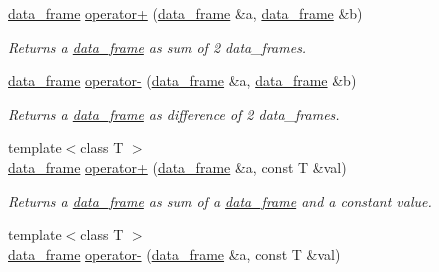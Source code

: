 \begin{DoxyCompactItemize}
\item 
\hyperlink{classboost_1_1numeric_1_1ublas_1_1data__frame}{data\+\_\+frame} \hyperlink{classboost_1_1numeric_1_1ublas_1_1data__frame_a9f8e1971f815794218a6263e5dfd75de}{operator+} (\hyperlink{classboost_1_1numeric_1_1ublas_1_1data__frame}{data\+\_\+frame} \&a, \hyperlink{classboost_1_1numeric_1_1ublas_1_1data__frame}{data\+\_\+frame} \&b)
\begin{DoxyCompactList}\small\item\em Returns a \hyperlink{classboost_1_1numeric_1_1ublas_1_1data__frame}{data\+\_\+frame} as sum of 2 data\+\_\+frames. \end{DoxyCompactList}\item 
\hyperlink{classboost_1_1numeric_1_1ublas_1_1data__frame}{data\+\_\+frame} \hyperlink{classboost_1_1numeric_1_1ublas_1_1data__frame_a5335edb8f4c4e47904709353bbc0be62}{operator-\/} (\hyperlink{classboost_1_1numeric_1_1ublas_1_1data__frame}{data\+\_\+frame} \&a, \hyperlink{classboost_1_1numeric_1_1ublas_1_1data__frame}{data\+\_\+frame} \&b)
\begin{DoxyCompactList}\small\item\em Returns a \hyperlink{classboost_1_1numeric_1_1ublas_1_1data__frame}{data\+\_\+frame} as difference of 2 data\+\_\+frames. \end{DoxyCompactList}\item 
{\footnotesize template$<$class T $>$ }\\\hyperlink{classboost_1_1numeric_1_1ublas_1_1data__frame}{data\+\_\+frame} \hyperlink{classboost_1_1numeric_1_1ublas_1_1data__frame_ad9563098b841adefde7f5075143a7992}{operator+} (\hyperlink{classboost_1_1numeric_1_1ublas_1_1data__frame}{data\+\_\+frame} \&a, const T \&val)
\begin{DoxyCompactList}\small\item\em Returns a \hyperlink{classboost_1_1numeric_1_1ublas_1_1data__frame}{data\+\_\+frame} as sum of a \hyperlink{classboost_1_1numeric_1_1ublas_1_1data__frame}{data\+\_\+frame} and a constant value. \end{DoxyCompactList}\item 
{\footnotesize template$<$class T $>$ }\\\hyperlink{classboost_1_1numeric_1_1ublas_1_1data__frame}{data\+\_\+frame} \hyperlink{classboost_1_1numeric_1_1ublas_1_1data__frame_ad4713c3ec7a92040b9792d9f77907de6}{operator-\/} (\hyperlink{classboost_1_1numeric_1_1ublas_1_1data__frame}{data\+\_\+frame} \&a, const T \&val)

\end{DoxyCompactItemize}
